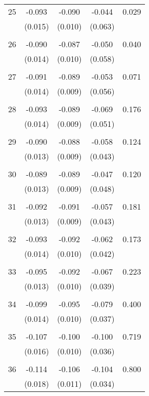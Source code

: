 \begin{tabular}{l*{1}{cccc}}
  25       & -0.093 & -0.090 & -0.044 & 0.029 \\
          & (0.015) & (0.010) & (0.063) & \\
 & & & &\\
  26       & -0.090 & -0.087 & -0.050 & 0.040 \\
          & (0.014) & (0.010) & (0.058) & \\
 & & & &\\
  27       & -0.091 & -0.089 & -0.053 & 0.071 \\
          & (0.014) & (0.009) & (0.056) & \\
 & & & &\\
  28       & -0.093 & -0.089 & -0.069 & 0.176 \\
          & (0.014) & (0.009) & (0.051) & \\
 & & & &\\
  29       & -0.090 & -0.088 & -0.058 & 0.124 \\
          & (0.013) & (0.009) & (0.043) & \\
 & & & &\\
  30       & -0.089 & -0.089 & -0.047 & 0.120 \\
          & (0.013) & (0.009) & (0.048) & \\
 & & & &\\
  31       & -0.092 & -0.091 & -0.057 & 0.181 \\
          & (0.013) & (0.009) & (0.043) & \\
 & & & &\\
  32       & -0.093 & -0.092 & -0.062 & 0.173 \\
          & (0.014) & (0.010) & (0.042) & \\
 & & & &\\
  33       & -0.095 & -0.092 & -0.067 & 0.223 \\
          & (0.013) & (0.010) & (0.039) & \\
 & & & &\\
  34       & -0.099 & -0.095 & -0.079 & 0.400 \\
          & (0.014) & (0.010) & (0.037) & \\
 & & & &\\
  35       & -0.107 & -0.100 & -0.100 & 0.719 \\
          & (0.016) & (0.010) & (0.036) & \\
 & & & &\\
  36       & -0.114 & -0.106 & -0.104 & 0.800 \\
          & (0.018) & (0.011) & (0.034) & \\

\end{tabular}

